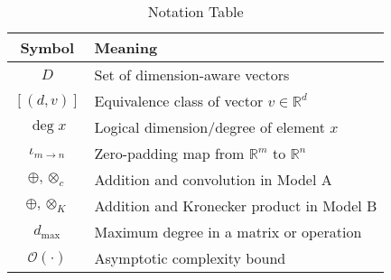 \documentclass[sigconf,review]{acmart}
\begin{document}
\begin{table}[h]
\centering
\caption{Notation Table}
\begin{tabular}{cl}
\toprule
\textbf{Symbol} & \textbf{Meaning} \\
\midrule
$D$ & Set of dimension-aware vectors \\
$[(d,v)]$ & Equivalence class of vector $v \in \mathbb{R}^d$ \\
$\deg x$ & Logical dimension/degree of element $x$ \\
$\iota_{m \to n}$ & Zero-padding map from $\mathbb{R}^m$ to $\mathbb{R}^n$ \\
$\oplus, \otimes_c$ & Addition and convolution in Model A \\
$\oplus, \otimes_K$ & Addition and Kronecker product in Model B \\
$d_{\max}$ & Maximum degree in a matrix or operation \\
$\mathcal{O}(\cdot)$ & Asymptotic complexity bound \\
\bottomrule
\end{tabular}
\end{table}
\end{document}
